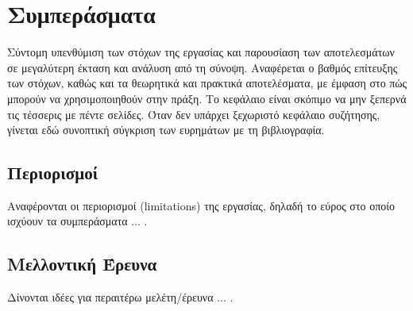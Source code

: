 \section{Συμπεράσματα}

Σύντομη υπενθύμιση των στόχων της εργασίας και παρουσίαση των
αποτελεσμάτων σε μεγαλύτερη έκταση και ανάλυση από τη σύνοψη. Αναφέρεται ο
βαθμός επίτευξης των στόχων, καθώς και τα θεωρητικά και πρακτικά
αποτελέσματα, με έμφαση στο πώς μπορούν να χρησιμοποιηθούν στην πράξη. Το
κεφάλαιο είναι σκόπιμο να μην ξεπερνά τις τέσσερις με πέντε σελίδες. Όταν
δεν υπάρχει ξεχωριστό κεφάλαιο συζήτησης, γίνεται εδώ συνοπτική σύγκριση
των ευρημάτων με τη βιβλιογραφία.

\subsection{Περιορισμοί}

Αναφέρονται οι περιορισμοί (limitations) της εργασίας, δηλαδή το εύρος στο
οποίο ισχύουν τα συμπεράσματα ... .

\subsection{Μελλοντική Έρευνα}

Δίνονται ιδέες για περαιτέρω μελέτη/έρευνα ... .
